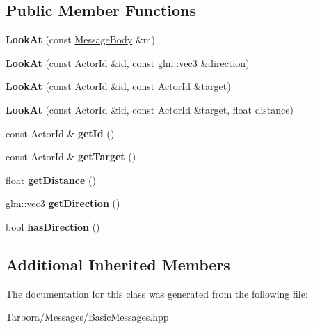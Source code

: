 \subsection*{Public Member Functions}
\begin{DoxyCompactItemize}
\item 
\mbox{\label{classTarbora_1_1Message_1_1LookAt_a3d775594bc15f9ea91ed3e460f2f0c1e}} 
{\bfseries Look\+At} (const \hyperlink{classTarbora_1_1MessageBody}{Message\+Body} \&m)
\item 
\mbox{\label{classTarbora_1_1Message_1_1LookAt_a489b1d86d421f5fc041891452dbc5b05}} 
{\bfseries Look\+At} (const Actor\+Id \&id, const glm\+::vec3 \&direction)
\item 
\mbox{\label{classTarbora_1_1Message_1_1LookAt_a317eee28d4aae9c94e1a8a524d17d8f2}} 
{\bfseries Look\+At} (const Actor\+Id \&id, const Actor\+Id \&target)
\item 
\mbox{\label{classTarbora_1_1Message_1_1LookAt_a27d66789fb1ef6fdb120c06ac6224f55}} 
{\bfseries Look\+At} (const Actor\+Id \&id, const Actor\+Id \&target, float distance)
\item 
\mbox{\label{classTarbora_1_1Message_1_1LookAt_a1fd337a8fd3b3e28148b8e4c2a45e6d7}} 
const Actor\+Id \& {\bfseries get\+Id} ()
\item 
\mbox{\label{classTarbora_1_1Message_1_1LookAt_a4b591d43b26663009acf4c3df1f71512}} 
const Actor\+Id \& {\bfseries get\+Target} ()
\item 
\mbox{\label{classTarbora_1_1Message_1_1LookAt_ae60b2a2635757c25fe6c9131aba223ce}} 
float {\bfseries get\+Distance} ()
\item 
\mbox{\label{classTarbora_1_1Message_1_1LookAt_a8bbb04658266cd4219d81280997de332}} 
glm\+::vec3 {\bfseries get\+Direction} ()
\item 
\mbox{\label{classTarbora_1_1Message_1_1LookAt_ad7bf541789ffe467b18cd403d74a4bb4}} 
bool {\bfseries has\+Direction} ()
\end{DoxyCompactItemize}
\subsection*{Additional Inherited Members}


The documentation for this class was generated from the following file\+:\begin{DoxyCompactItemize}
\item 
Tarbora/\+Messages/Basic\+Messages.\+hpp\end{DoxyCompactItemize}

